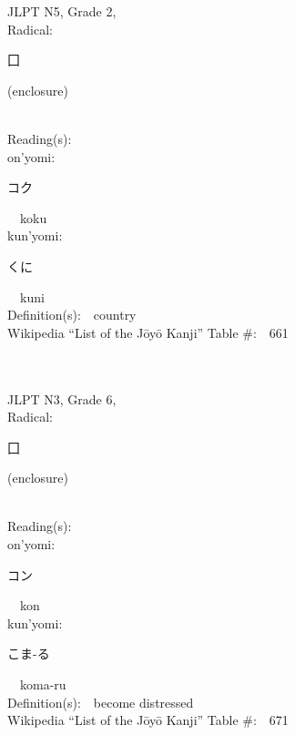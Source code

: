 \begin{multicols}{2}
{JLPT N5, Grade 2, \\Radical:\ \ {\begin{CJK}{UTF8}{min} 囗 \end{CJK}} (enclosure) } \\
Reading(s):\ \ \\
{\hspace*{1em}}on'yomi:\ \ \\
{\hspace*{2em}}{\begin{CJK}{UTF8}{min} コク \end{CJK}}\ \ koku\ \ \\
{\hspace*{1em}}kun'yomi:\ \ \\
{\hspace*{2em}}{\begin{CJK}{UTF8}{min} くに \end{CJK}}\ \ kuni\ \ \\
Definition(s):\ \ country \\
Wikipedia ``List of the J\=oy\=o Kanji'' Table \#:\ \ 661 \\
\ \ \\
{\fontsize{34pt}{40pt}  }\ \ \\  %
{JLPT N3, Grade 6, \\Radical:\ \ {\begin{CJK}{UTF8}{min} 囗 \end{CJK}} (enclosure) } \\
Reading(s):\ \ \\
{\hspace*{1em}}on'yomi:\ \ \\
{\hspace*{2em}}{\begin{CJK}{UTF8}{min} コン \end{CJK}}\ \ kon\ \ \\
{\hspace*{1em}}kun'yomi:\ \ \\
{\hspace*{2em}}{\begin{CJK}{UTF8}{min} こま-る \end{CJK}}\ \ koma-ru\ \ \\
Definition(s):\ \ become distressed \\
Wikipedia ``List of the J\=oy\=o Kanji'' Table \#:\ \ 671 \\

\end{multicols}
